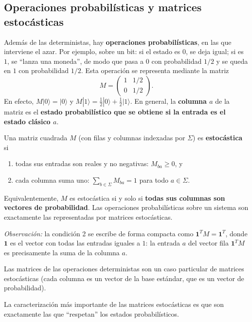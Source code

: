 \documentclass[11pt, a4paper, twoside, openright]{report}
\begin{document}
\subsection{Operaciones probabilísticas y matrices estocásticas}

\noindent Además de las deterministas, hay \textbf{operaciones probabilísticas}, en las que interviene el azar. Por ejemplo, sobre un bit: si el estado es $0$, se deja igual; si es $1$, se ``lanza una moneda'', de modo que pasa a $0$ con probabilidad $1/2$ y se queda en $1$ con probabilidad $1/2$. Esta operación se representa mediante la matriz
\[ M = \begin{pmatrix} 1 & 1/2 \\ 0 & 1/2 \end{pmatrix}. \]
En efecto, $M|0\rangle = |0\rangle$ y $M|1\rangle = \frac{1}{2}|0\rangle + \frac{1}{2}|1\rangle$. En general, la \textbf{columna $a$} de la matriz es el \textbf{estado probabilístico que se obtiene si la entrada es el estado clásico $a$}.

\begin{tcolorbox}[colback=teal!5!white,colframe=teal!75!black,title=\textbf{Definición: Matriz estocástica}]
Una matriz cuadrada $M$ (con filas y columnas indexadas por $\Sigma$) es \textbf{estocástica} si
\begin{enumerate}
    \item todas sus entradas son reales y no negativas: $M_{ba} \geq 0$, y
    \item cada columna suma uno: $\displaystyle\sum_{b \in \Sigma} M_{ba} = 1$ para todo $a \in \Sigma$.
\end{enumerate}
Equivalentemente, $M$ es estocástica si y solo si \textbf{todas sus columnas son vectores de probabilidad}. Las operaciones probabilísticas sobre un sistema son exactamente las representadas por matrices estocásticas.

\textit{Observación:} la condición 2 se escribe de forma compacta como $\mathbf{1}^T M = \mathbf{1}^T$, donde $\mathbf{1}$ es el vector con todas las entradas iguales a $1$: la entrada $a$ del vector fila $\mathbf{1}^T M$ es precisamente la suma de la columna $a$.
\end{tcolorbox}

\noindent Las matrices de las operaciones deterministas son un caso particular de matrices estocásticas (cada columna es un vector de la base estándar, que es un vector de probabilidad).

\noindent La caracterización más importante de las matrices estocásticas es que son exactamente las que ``respetan'' los estados probabilísticos.
\end{document}
